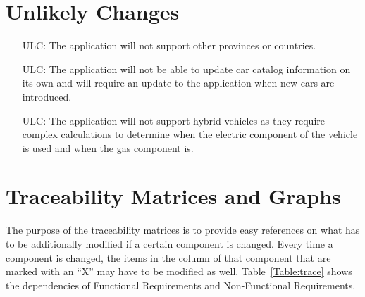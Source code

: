 \documentclass[12pt]{article}
\newcounter{lcnum} %
\newcounter{ulcnum} %
\begin{document}
\section{Unlikely Changes}    

\noindent \begin{itemize}

\item[ULC\refstepcounter{ulcnum}\theulcnum\label{Regional Support}:] The application will not support other provinces or countries.

\item[ULC\refstepcounter{ulcnum}\theulcnum\label{New Cars}:] The application will not be able to update car catalog information on its own and will require an update to the application when new cars are introduced.

\item[ULC\refstepcounter{ulcnum}\theulcnum\label{Hybrid Cars}:] The application will not support hybrid vehicles as they require complex calculations to determine when the electric component of the vehicle is used and when the gas component is.

\end{itemize}

\newpage

\section{Traceability Matrices and Graphs}

The purpose of the traceability matrices is to provide easy references on what
has to be additionally modified if a certain component is changed.  Every time a
component is changed, the items in the column of that component that are marked
with an ``X'' may have to be modified as well.  Table~\ref{Table:trace} shows the
dependencies of Functional Requirements and Non-Functional Requirements.
\end{document}
